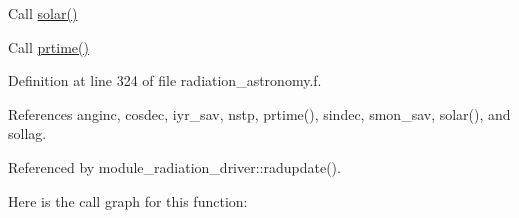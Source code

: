 \begin{DoxyEnumerate}
\item Call \hyperlink{group__module__radiation__astronomy_ga33f3a3fbb7f232aab2a624025c991890}{solar()}
\item Call \hyperlink{group__module__radiation__astronomy_gaee29441c2e62c44728b10915a148cccf}{prtime()} 
\end{DoxyEnumerate}

Definition at line 324 of file radiation\+\_\+astronomy.\+f.



References anginc, cosdec, iyr\+\_\+sav, nstp, prtime(), sindec, smon\+\_\+sav, solar(), and sollag.



Referenced by module\+\_\+radiation\+\_\+driver\+::radupdate().

Here is the call graph for this function\+:
